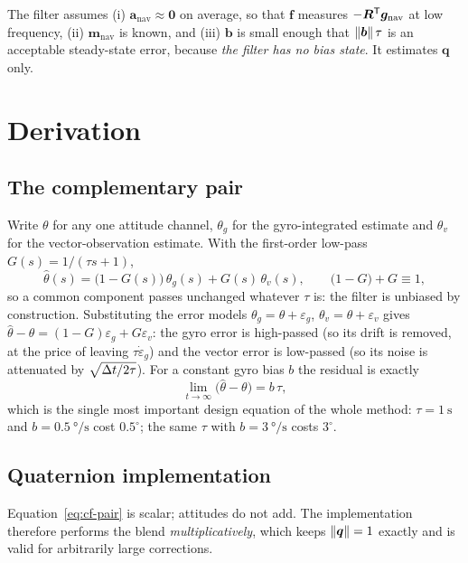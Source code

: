 The filter assumes (i) $\bm{a}_{\text{nav}}\approx\bm{0}$ on average, so that $\bm{f}$ measures
$-\bm{R}^{\mathsf{T}}\bm{g}_{\text{nav}}$ at low frequency, (ii) $\bm{m}_{\text{nav}}$ is known, and
(iii) $\bm{b}$ is small enough that $\left\lVert \bm{b} \right\rVert\tau$ is an acceptable steady-state error, because
\emph{the filter has no bias state}. It estimates $\bm{q}$ only.

\section{Derivation}

\subsection{The complementary pair}
Write $\theta$ for any one attitude channel, $\theta_g$ for the gyro-integrated estimate and
$\theta_v$ for the vector-observation estimate. With the first-order low-pass
$G(s)=1/(\tau s+1)$,
\begin{equation}
\hat\theta(s) = \big(1-G(s)\big)\,\theta_g(s) + G(s)\,\theta_v(s),
\qquad \big(1-G\big)+G \equiv 1,
\label{eq:cf-pair}
\end{equation}
so a common component passes unchanged whatever $\tau$ is: the filter is unbiased by construction.
Substituting the error models $\theta_g=\theta+\varepsilon_g$, $\theta_v=\theta+\varepsilon_v$
gives $\hat\theta-\theta = (1-G)\varepsilon_g + G\varepsilon_v$: the gyro error is high-passed
(so its drift is removed, at the price of leaving $\tau\dot\varepsilon_g$) and the vector error is
low-passed (so its noise is attenuated by $\sqrt{\Delta t/2\tau}$). For a constant gyro bias $b$ the
residual is exactly
\begin{equation}
\lim_{t\to\infty}\big(\hat\theta-\theta\big) = b\,\tau ,
\label{eq:cf-bias}
\end{equation}
which is the single most important design equation of the whole method: $\tau=\SI{1}{\second}$ and
$b=\SI{0.5}{\degree\per\second}$ cost $0.5^\circ$; the same $\tau$ with
$b=\SI{3}{\degree\per\second}$ costs $3^\circ$.

\subsection{Quaternion implementation}
Equation~\eqref{eq:cf-pair} is scalar; attitudes do not add. The implementation therefore performs
the blend \emph{multiplicatively}, which keeps $\left\lVert \bm{q} \right\rVert=1$ exactly and is valid for
arbitrarily large corrections.


